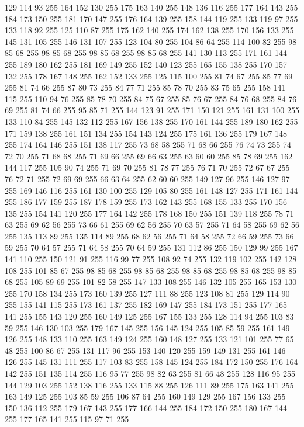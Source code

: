 129 114 93 255 164 152 130 255 175 163 140 255 148 136 116 255 177 164 143 255 184 173 150 255 181 170 147 255 176 164 139 255 158 144 119 255 133 119 97 255 133 118 92 255 125 110 87 255 175 162 140 255 174 162 138 255 170 156 133 255 145 131 105 255 146 131 107 255 123 104 80 255 104 86 64 255 114 100 82 255 98 85 68 255 98 85 68 255 98 85 68 255 98 85 68 255 141 130 113 255 171 161 144 255 189 180 162 255 181 169 149 255 152 140 123 255 165 155 138 255 170 157 132 255 178 167 148 255 162 152 133 255 125 115 100 255 81 74 67 255 85 77 69 255 81 74 66 255 87 80 73 255 84 77 71 255 85 78 70 255 83 75 65 255 158 141 115 255 110 94 76 255 85 78 70 255 84 75 67 255 85 76 67 255 84 76 68 255 84 76 69 255 81 74 66 255 95 85 71 255 144 123 91 255 171 150 121 255 161 131 100 255 133 110 84 255 145 132 112 255 167 156 138 255 170 161 144 255 189 180 162 255 171 159 138 255 161 151 134 255 154 143 124 255 175 161 136 255 179 167 148 255 174 164 146 255
151 138 117 255 73 68 58 255 71 68 66 255 76 74 73 255 74 72 70 255 71 68 68 255 71 69 66 255 69 66 63 255 63 60 60 255 85 78 69 255 162 144 117 255 105 90 74 255 71 69 70 255 81 78 77 255 76 71 70 255 72 67 67 255 76 72 71 255 72 69 69 255 66 63 64 255 62 60 60 255 149 127 96 255 146 127 97 255 169 146 116 255 161 130 100 255 129 105 80 255 161 148 127 255 171 161 144 255 186 177 159 255 187 178 159 255 173 162 143 255 168 155 133 255 170 156 135 255 154 141 120 255 177 164 142 255 178 168 150 255 151 139 118 255 78 71 63 255 69 62 56 255 73 66 61 255 69 62 56 255 70 63 57 255 71 64 58 255 69 62 56 255 135 113 89 255 135 114 89 255 68 62 56 255 71 64 58 255 72 66 59 255 73 66 59 255 70 64 57 255 71 64 58 255 70 64 59 255 131 112 86 255 150 129 99 255 167 141 110 255 150 121 91 255 116 99 77 255 108 92 74 255 132 119 102 255 142 128 108 255 101 85 67 255 98 85 68 255 98 85 68 255 98 85 68 255
98 85 68 255 98 85 68 255 105 89 69 255 101 82 58 255 147 133 108 255 146 132 105 255 165 153 130 255 170 158 134 255 173 160 139 255 127 111 88 255 123 108 81 255 129 114 90 255 155 141 115 255 173 161 137 255 182 169 147 255 184 173 151 255 177 165 141 255 155 143 120 255 160 149 125 255 167 155 133 255 128 114 94 255 103 83 59 255 146 130 103 255 179 167 145 255 156 145 124 255 105 85 59 255 161 149 126 255 148 133 110 255 163 149 124 255 160 148 127 255 133 121 101 255 77 65 48 255 100 86 67 255 131 117 96 255 153 140 120 255 159 149 131 255 161 146 126 255 145 131 111 255 117 103 83 255 158 145 124 255 184 172 150 255 176 164 142 255 151 135 114 255 116 95 77 255 98 82 63 255 81 66 48 255 128 116 95 255 144 129 103 255 152 138 116 255 133 115 88 255 126 111 89 255 175 163 141 255 163 149 125 255 103 85 59 255 106 87 64 255 160 149 129 255 167 156 133 255 150 136 112 255 179 167 143 255 177 166 144 255 184 172 150 255 180 167 144 255 177 165 141 255 115 97 71 255
